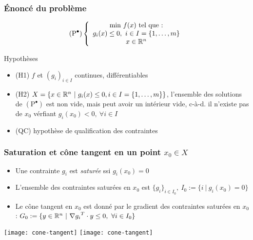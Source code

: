 \documentclass{beamer}
\newcommand{\R}{{\ensuremath\mathbb{R}}}
\begin{document}
\begin{frame}
  \frametitle{\'Enoncé du problème}

  \[
  (\text{P}^\bullet) \left\{
  \begin{array}{c}
    \text{min} \ f(x) \ \text{tel que :} \\
    g_i(x) \leq 0, \ i \in I = \{1, \dots, m\} \\
    x \in \R^n
  \end{array}
  \right.
  \]

  \begin{block}{Hypothèses}
    \begin{itemize}
    \item (H1) $f$ et $(g_i)_{i \in I}$ continues, différentiables
    \item (H2) $X = \{ x \in \R^n \ | \ g_i(x) \leq 0, i \in I = \{1, \dots, m\} \}$,
      l'ensemble des solutions de $(\text{P}^\bullet)$ est non vide, mais peut avoir un
      intérieur vide, c-à-d. il n'existe pas de $x_0$ vérfiant $g_i(x_0) < 0, \ \forall i \in I$
    \item (QC) \alert{hypothèse de qualification des contraintes}
    \end{itemize}
  \end{block}
  
\end{frame}

\begin{frame}
  \frametitle{Saturation et cône tangent en un point $x_0 \in X$}

  \begin{itemize}
    \item Une contrainte $g_i$ est \emph{saturée} ssi $g_i(x_0) = 0$
    \item L'ensemble des contraintes saturées en $x_0$ est
      $\{g_i\}_{i \in I_0}, \ I_0 := \{i \ | \ g_i(x_0) = 0 \}$
    \item Le cône tangent en $x_0$ est donné par le gradient des contraintes saturées en $x_0$ :
      $G_0 := \{ y \in \R^n \ | \ {\nabla g_i}^T \cdot y \leq 0, \ \forall i \in I_0 \}$ 
  \end{itemize}

  \begin{center}
      \texttt{[image: cone-tangent]} \hspace{0.01\textwidth}   
      \texttt{[image: cone-tangent]}    
  \end{center}
  
\end{frame}
\end{document}
